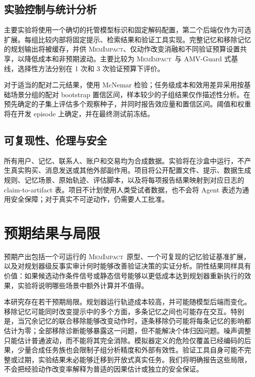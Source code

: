\documentclass[11pt]{article}
\newcommand{\method}{\textsc{MemImpact}}
\begin{document}
\subsection{实验控制与统计分析}

主要实验将使用一个确切的托管模型标识和固定解码配置，第二个后端仅作为可选扩展。每组比较内部将固定提示、检索结果和验证工具实现。完整记忆和移除记忆的规划输出将被缓存，并供 \method、仅动作改变消融和不同验证预算设置共享，以降低成本和非预期波动。主要比较为 \method\ 与 AMV-Guard 式基线，选择性方法分别在 1 次和 3 次验证预算下评价。

对于适当的配对二元结果，使用 McNemar 检验；任务级成本和效用差异采用按基础场景分组的配对 bootstrap 置信区间，样本较少的子组结果仅作描述性分析。在预先确定的子集上评估多个观察种子，并同时报告效应量和置信区间。阈值和权重将在开发 episode 上确定，并在最终测试前冻结。

\subsection{可复现性、伦理与安全}

所有用户、记忆、联系人、账户和交易均为合成数据。实验将在沙盒中运行，不产生真实购买、消息发送或其他外部副作用。项目将公开配置文件、提示、数据生成规则、记忆场景、原始轨迹、评估脚本，以及将每项报告结果映射到对应日志的 claim-to-artifact 表。项目不计划使用人类受试者数据，也不会将 Agent 表述为通用安全保障；对于真实不可逆动作，仍需要人工批准。

\section{预期结果与局限}

预期产出包括一个可运行的 \method\ 原型、一个可复现的记忆验证基准扩展，以及对规划器级反事实审计何时能够改善验证决策的实证分析。阴性结果同样具有价值：如果候选动作条件信号或静态信号能够以更低成本达到规划器重新执行的效果，实验将说明哪些场景中额外计算并不值得。

本研究存在若干预期局限。规划器运行轨迹成本较高，并可能随模型后端而变化。移除记忆可能同时改变提示中的多个方面，多条记忆之间也可能存在交互。特别是，当冗余记忆的联合移除能够改变动作时，逐条移除仍可能将每条记忆的影响都估计为零；全部移除诊断能够暴露这一问题，但不能解决个体归因问题。噪声调整只能估计普通波动，而不能将其完全消除。模拟器定义的危险仅覆盖已经编码的后果，少量合成任务族也会限制子组分析精度和外部有效性。验证工具自身可能不完整或过期，实验结果未必能够迁移到开放式真实任务。我们将明确报告这些局限，不会把经验动作改变率解释为普适的因果估计或独立的安全保证。
\end{document}
